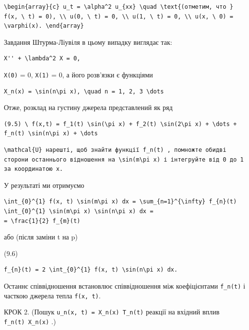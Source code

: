 \documentclass[
  ukrainian,
]{article}
\begin{document}
\begin{verbatim}
\begin{array}{c} u_t = \alpha^2 u_{xx} \quad \text{(отметим, что } f(x, \ t) = 0), \\ u(0, \ t) = 0, \\ u(1, \ t) = 0, \\ u(x, \ 0) = \varphi(x). \end{array}
\end{verbatim}

Завдання Штурма-Ліувіля в цьому випадку виглядає так:

\begin{verbatim}
X'' + \lambda^2 X = 0,
\end{verbatim}

\texttt{X(0)} = 0, \texttt{X(1)} = 0, а його розв'язки є функціями

\begin{verbatim}
X_n(x) = \sin(n\pi x), \quad n = 1, 2, 3 \dots
\end{verbatim}

Отже, розклад на густину джерела представлений як ряд

\begin{verbatim}
(9.5) \ f(x,t) = f_1(t) \sin(\pi x) + f_2(t) \sin(2\pi x) + \dots + f_n(t) \sin(n\pi x) + \dots
\end{verbatim}

\begin{verbatim}
\mathcal{U} нарешті, щоб знайти функції f_n(t) , помножте обидві сторони останнього відношення на \sin(m\pi x) і інтегруйте від 0 до 1 за координатою x.
\end{verbatim}

У результаті ми отримуємо

\begin{verbatim}
\int_{0}^{1} f(x, t) \sin(m\pi x) dx = \sum_{n=1}^{\infty} f_{n}(t) \int_{0}^{1} \sin(m\pi x) \sin(n\pi x) dx =
= \frac{1}{2} f_{m}(t)
\end{verbatim}

або (після заміни t на p)

(9.6)

\begin{verbatim}
f_{n}(t) = 2 \int_{0}^{1} f(x, t) \sin(n\pi x) dx.
\end{verbatim}

Останнє співвідношення встановлює співвідношення між коефіцієнтами
\texttt{f\_n(t)} і часткою джерела тепла \texttt{f(x,\ t)}.

КРОК 2. (Пошук \texttt{u\_n(x,\ t)\ =\ X\_n(x)\ T\_n(t)} реакції на
вхідний вплив \texttt{f\_n(t)\ X\_n(x)} .)
\end{document}
